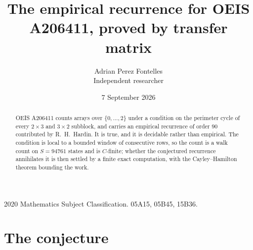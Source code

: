 \documentclass[11pt,a4paper]{article}
\title{The empirical recurrence for OEIS A206411, proved by transfer matrix}
\author{Adrian Perez Fontelles\\ \small Independent researcher}
\date{7 September 2026}
\theoremstyle{plain}
\theoremstyle{definition}
\begin{document}
\maketitle

\begin{abstract}
OEIS A206411 counts arrays over $\{0,\dots,2\}$ under a condition on the perimeter cycle of
every $2\times3$ and $3\times2$ subblock, and carries an empirical recurrence of order $90$ contributed by
R.~H.~Hardin. It is true, and it is decidable rather than empirical. The condition is local to
a bounded window of consecutive rows, so the count is a walk count on $S=94761$ states and is
$C$-finite; whether the conjectured recurrence annihilates it is then settled by a finite exact
computation, with the Cayley--Hamilton theorem bounding the work.
\end{abstract}

\noindent\small 2020 Mathematics Subject Classification. 05A15, 05B45, 15B36.\normalsize

\section{The conjecture}
\end{document}
